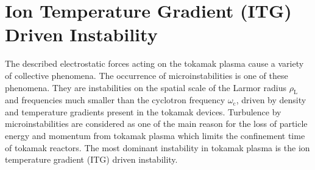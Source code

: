 \newpage
\section{Ion Temperature Gradient (ITG) Driven Instability}
\label{sec:ITG}

The described electrostatic forces acting on the tokamak plasma cause a variety of collective phenomena. The occurrence of microinstabilities is one of these phenomena. They are instabilities on the spatial scale of the Larmor radius $\rho_\mathrm{L}$ and frequencies much smaller than the cyclotron frequency $\omega_\mathrm{c}$, driven by density and temperature gradients present in the tokamak devices. Turbulence by microinstabilities are considered as one of the main reason for the loss of particle energy and momentum from tokamak plasma \cite{Brizard2007, Garbet2010, Horton1999} which limits the confinement time of tokamak reactors. The most dominant instability in tokamak plasma is the ion temperature gradient (ITG) driven instability. \cite{Coppi1967, Cowley1991, Rudakov1961}

\begin{center}
	\captionsetup{type=figure}
	
	\label{fig:ITG}
\end{center}

